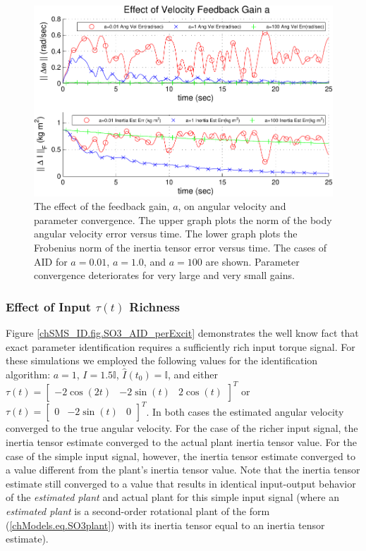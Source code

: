 \begin{center}
\begin{figure}[htbp]
  \begin{center}
    \includegraphics[width=150mm]{./chSMS_ID/images/gainFig01}
  \end{center}
  \caption{The effect of the feedback gain, $a$, on angular velocity and
    parameter convergence.  The upper graph plots the norm of the body
    angular velocity error versus time.  The lower graph plots the
    Frobenius norm of the inertia tensor error versus time.  The cases
    of \ac{AID} for $a=0.01$, $a=1.0$, and $a=100$ are
    shown.  Parameter convergence deteriorates for very large and very
    small gains.  }  \label{chSMS_ID.fig.SO3_AID_gains}
\end{figure}
\end{center}

\subsubsection{Effect of Input $\tau(t)$ Richness}

Figure \ref{chSMS_ID.fig.SO3_AID_perExcit} demonstrates the well know
fact that exact parameter identification requires a sufficiently rich
input torque signal.  For these simulations we employed the following
values for the identification algorithm: $a=1$, $I=1.5\mathbb{I}$,
$\hat{I}(t_0)=\mathbb{I}$, and either
$\tau(t)=\left[\begin{array}{ccc}-2\cos(2t)& -2\sin(t)&
    2\cos(t)\end{array}\right]^{T}$ or
$\tau(t)=\left[\begin{array}{ccc}0& -2\sin(t)&
    0\end{array}\right]^{T}$.  In both cases the estimated angular
velocity converged to the true angular velocity. For the case of the
richer input signal, the inertia tensor estimate converged to the
actual plant inertia tensor value.  
%
For the case of the simple input signal, however, the inertia tensor
estimate converged to a value different from the plant's inertia
tensor value.
%
Note that the inertia tensor estimate still converged to a value that
results in identical input-output behavior of the {\it estimated
  plant} and actual plant for this simple input signal (where an {\it
  estimated plant} is a second-order rotational plant of the form
(\ref{chModels.eq.SO3plant}) with its inertia tensor equal to an
inertia tensor estimate).


